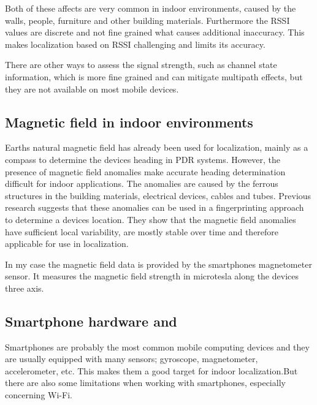 Both of these affects are very common in indoor environments, caused by the walls, people, furniture and other building materials. Furthermore the RSSI values are discrete and not fine grained what causes additional inaccuracy. This makes localization based on RSSI challenging and limits its accuracy.

There are other ways to assess the signal strength, such as channel state information, which is more fine grained and can mitigate multipath effects, but they are not available on most mobile devices\cite{JoseMaster,FineGrainedIndoorTracking}.


\subsection{Magnetic field in indoor environments}

Earths natural magnetic field has already been used for localization, mainly as a compass to determine the devices heading in PDR systems. However, the presence of magnetic field anomalies make accurate heading determination difficult for indoor applications. The anomalies are caused by the ferrous structures in the building materials, electrical devices, cables and tubes. Previous research suggests that these anomalies can be used in a fingerprinting approach to determine a devices location\cite{haverinen2009global,angermann2012CharacterizationMagnetic,Li2012feasableMagnetic}. They show that the magnetic field anomalies have sufficient local variability, are mostly stable over time and therefore applicable for use in localization.

In my case the magnetic field data is provided by the smartphones magnetometer sensor. It measures the magnetic field strength in microtesla along the devices three axis.\\

\subsection{Smartphone hardware and }

Smartphones are probably the most common mobile computing devices and they are usually equipped with many sensors; gyroscope, magnetometer, accelerometer, etc. This makes them a good target for indoor localization.But there are also some limitations when working with smartphones, especially concerning Wi-Fi.

